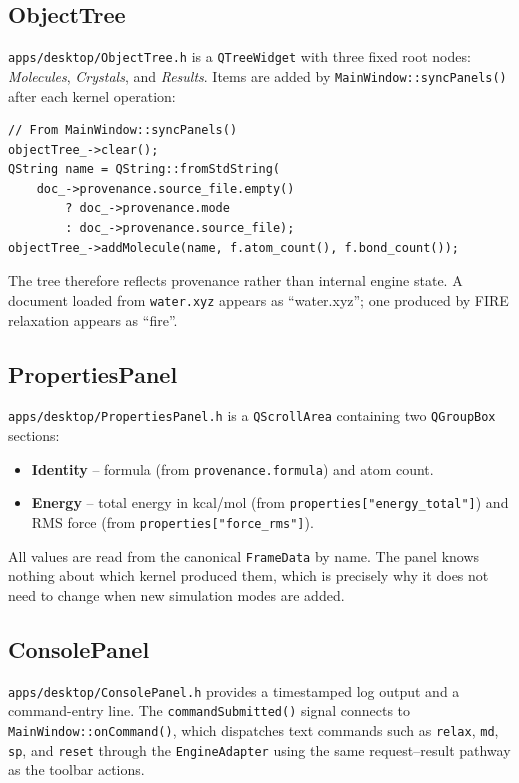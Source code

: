 ﻿\documentclass[11pt]{article}
\newcommand{\file}[1]{\texttt{#1}}
\newcommand{\type}[1]{\texttt{#1}}
\newcommand{\field}[1]{\texttt{#1}}
\newcommand{\op}[1]{\texttt{#1}}
\begin{document}
\subsection{ObjectTree}

\file{apps/desktop/ObjectTree.h} is a \type{QTreeWidget} with three fixed
root nodes: \emph{Molecules}, \emph{Crystals}, and \emph{Results}. Items are
added by \type{MainWindow::syncPanels()} after each kernel operation:

\begin{lstlisting}
// From MainWindow::syncPanels()
objectTree_->clear();
QString name = QString::fromStdString(
    doc_->provenance.source_file.empty()
        ? doc_->provenance.mode
        : doc_->provenance.source_file);
objectTree_->addMolecule(name, f.atom_count(), f.bond_count());
\end{lstlisting}

The tree therefore reflects provenance rather than internal engine state. A
document loaded from \texttt{water.xyz} appears as ``water.xyz''; one produced
by FIRE relaxation appears as ``fire''.

\subsection{PropertiesPanel}

\file{apps/desktop/PropertiesPanel.h} is a \type{QScrollArea} containing two
\type{QGroupBox} sections:

\begin{itemize}
  \item \textbf{Identity} -- formula (from \field{provenance.formula}) and
        atom count.
  \item \textbf{Energy} -- total energy in kcal/mol (from
        \field{properties["energy\_total"]}) and RMS force (from
        \field{properties["force\_rms"]}).
\end{itemize}

All values are read from the canonical \type{FrameData} by name. The panel
knows nothing about which kernel produced them, which is precisely why it does
not need to change when new simulation modes are added.

\subsection{ConsolePanel}

\file{apps/desktop/ConsolePanel.h} provides a timestamped log output and a
command-entry line. The \op{commandSubmitted()} signal connects to
\op{MainWindow::onCommand()}, which dispatches text commands such as
\texttt{relax}, \texttt{md}, \texttt{sp}, and \texttt{reset} through the
\type{EngineAdapter} using the same request--result pathway as the toolbar
actions.
\end{document}
